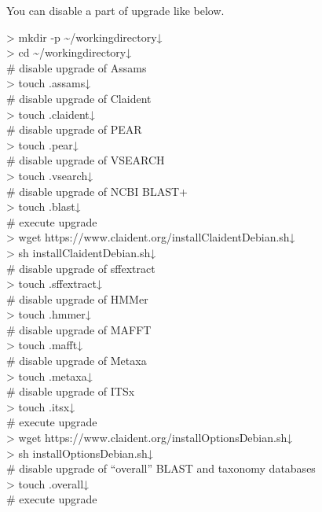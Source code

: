 \documentclass[titlepage,10pt,a4paper,english]{jsbook}
\newenvironment{cmd}{\begin{oframed}\raggedright\ttfamily\footnotesize\setlength{\baselineskip}{1.4em}}{\end{oframed}\vspace{-1em}}
\begin{document}
You can disable a part of upgrade like below.

\begin{cmd}
{\textgreater} mkdir -p {\textasciitilde}/workingdirectory↓\\
{\textgreater} cd {\textasciitilde}/workingdirectory↓\\
\# disable upgrade of Assams\\
{\textgreater} touch .assams↓\\
\# disable upgrade of Claident\\
{\textgreater} touch .claident↓\\
\# disable upgrade of PEAR\\
{\textgreater} touch .pear↓\\
\# disable upgrade of VSEARCH\\
{\textgreater} touch .vsearch↓\\
\# disable upgrade of NCBI BLAST+\\
{\textgreater} touch .blast↓\\
\# execute upgrade\\
{\textgreater} wget https://www.claident.org/installClaident{\textunderscore}Debian.sh↓\\
{\textgreater} sh installClaident{\textunderscore}Debian.sh↓\\
\# disable upgrade of sff{\textunderscore}extract\\
{\textgreater} touch .sffextract↓\\
\# disable upgrade of HMMer\\
{\textgreater} touch .hmmer↓\\
\# disable upgrade of MAFFT\\
{\textgreater} touch .mafft↓\\
\# disable upgrade of Metaxa\\
{\textgreater} touch .metaxa↓\\
\# disable upgrade of ITSx\\
{\textgreater} touch .itsx↓\\
\# execute upgrade\\
{\textgreater} wget https://www.claident.org/installOptions{\textunderscore}Debian.sh↓\\
{\textgreater} sh installOptions{\textunderscore}Debian.sh↓\\
\# disable upgrade of ``overall'' BLAST and taxonomy databases\\
{\textgreater} touch .overall↓\\
\# execute upgrade\\

\end{cmd}
\end{document}
